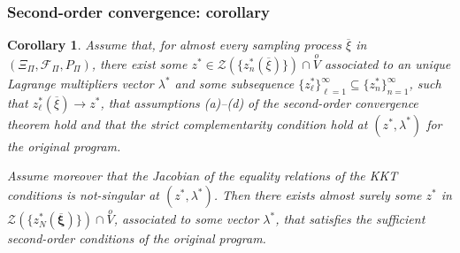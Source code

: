 \documentclass{beamer}
\newtheorem{coro}{Corollary}
\def\bxi{\boldsymbol\xi}
\begin{document}
\begin{frame}
\frametitle{Second-order convergence: corollary}

\begin{coro}
Assume that, for almost every sampling process $\overline{\xi}$ in $(\Xi_{\Pi}, \mathcal{F}_{\Pi}, P_{\Pi})$, there exist some $z^* \in \mathcal{Z} \left(\lbrace z^*_n(\overline{\xi})\rbrace\right) \cap \overset{o}{V}$ associated to an unique Lagrange multipliers vector $\lambda^*$ and some subsequence $\lbrace z_{\ell}^* \rbrace_{\ell = 1}^{\infty} \subseteq \lbrace  z_n^* \rbrace_{n = 1}^{\infty}$, such that $z^*_{\ell}(\overline{\xi}) \rightarrow z^*$, that assumptions (a)--(d) of the second-order convergence theorem hold and that the strict complementarity condition hold at $( z^*, \lambda^* )$ for the original program.

\mbox{}

Assume moreover that the Jacobian of the equality relations of the KKT conditions is not-singular at $( z^*, \lambda^* )$.
Then there exists almost surely some $z^*$ in $\mathcal{Z} \left( \lbrace z_N^*(\overline{\bxi}) \rbrace \right) \cap \overset{o}{V}$, associated to some vector $\lambda^*$, that satisfies the sufficient second-order conditions of the original program.
\end{coro}

\end{frame}





\end{document}
